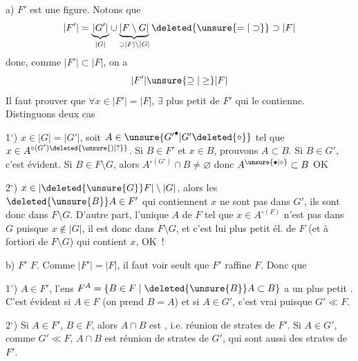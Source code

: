 a) $F'$ est une figure.  Notons que 
\[
 |F'|=\underbrace{|G'|}_{|G|}\cup\underbrace{|F\setminus G|}_{\supset |F|\setminus |G|}\deleted{\unsure{=|\supset}}\supset |F|
\]
donc, comme $|F'|\subset |F|$, on a
\[
 |F'|\unsure{\supseteq|\geq}|F|
\]
Il faut prouver que $\forall x\in |F'|=|F|$, $\exists$ plus petit  de $F'$ qui le contienne. Distinguons deux cas

1$^\circ$) $x\in |G|=|G'|$, soit $A\in\unsure{{G'}^\bullet|G'\deleted{\circ}}$ tel que $x\in A^{\circ(G')\deleted{\unsure{)|?}}}$. Si $B\in F'$ et  $x\in B$, prouvons $A\subset B$. Si $B\in G'$, c'est évident. Si $B\in F\setminus G$, alors  $A^{\circ(G')}\cap B\ne\varnothing$ donc $A^{\unsure{\bullet|\circ}}\subset B$ OK

2$^\circ$) $x\in |\deleted{\unsure{G}}F|\setminus |G|$, alors les $\deleted{\unsure{B}}A\in F'$ qui contiennent $x$ ne sont pas dans $G'$, ils sont donc dans $F\setminus G$. D'autre part, l'unique  $A$ de $F$ tel que $x\in A^{\circ(F)}$ n'est pas dans $G$ puisque $x\notin |G|$, il est donc dans $F\setminus G$, et  c'est lui plus petit él. de $F$ (et à fortiori de $F\setminus G$) qui contient $x$, OK~!

b) $F'$  $F$. Comme $|F'|=|F|$, il faut voir seult que $F'$ raffine $F$. Donc  que

1$^\circ$)  $A\in F'$, l'ens $F^A=\{B\in F\mid \deleted{\unsure{B}}A\subset B\}$ a un plus petit . C'est évident si $A\in F$  (on prend $B=A$) et si $A\in G'$, c'est vrai puisque $G'\ll F$.

2$^\circ$) Si $A\in F'$, $B\in F$, alors $A\cap B$ est , i.e. réunion de strates de $F'$. Si $A\in G'$, comme $G'\ll F$, $A\cap B$ est réunion de strates de $G'$, qui sont aussi des strates de $F'$.

